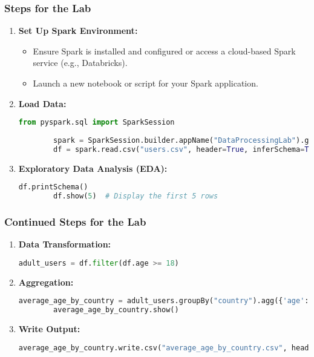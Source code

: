 \documentclass[aspectratio=169]{beamer}
\begin{document}
\begin{frame}[fragile]
    \frametitle{Steps for the Lab}
    \begin{enumerate}
        \item \textbf{Set Up Spark Environment:}
        \begin{itemize}
            \item Ensure Spark is installed and configured or access a cloud-based Spark service (e.g., Databricks).
            \item Launch a new notebook or script for your Spark application.
        \end{itemize}

        \item \textbf{Load Data:}
        \begin{lstlisting}[language=Python]
        from pyspark.sql import SparkSession
        
        spark = SparkSession.builder.appName("DataProcessingLab").getOrCreate()
        df = spark.read.csv("users.csv", header=True, inferSchema=True)
        \end{lstlisting}

        \item \textbf{Exploratory Data Analysis (EDA):}
        \begin{lstlisting}[language=Python]
        df.printSchema()
        df.show(5)  # Display the first 5 rows
        \end{lstlisting}
    \end{enumerate}
\end{frame}

\begin{frame}[fragile]
    \frametitle{Continued Steps for the Lab}
    \begin{enumerate}[resume]
        \item \textbf{Data Transformation:}
        \begin{lstlisting}[language=Python]
        adult_users = df.filter(df.age >= 18)
        \end{lstlisting}

        \item \textbf{Aggregation:}
        \begin{lstlisting}[language=Python]
        average_age_by_country = adult_users.groupBy("country").agg({'age': 'avg'})
        average_age_by_country.show()
        \end{lstlisting}

        \item \textbf{Write Output:}
        \begin{lstlisting}[language=Python]
        average_age_by_country.write.csv("average_age_by_country.csv", header=True)
        \end{lstlisting}
    \end{enumerate}
\end{frame}
\end{document}
